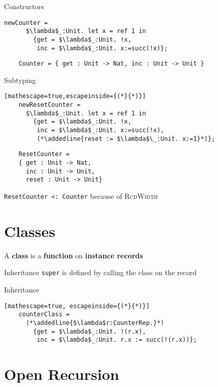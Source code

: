 \documentclass[presentation]{beamer}
\begin{document}
\begin{frame}[fragile]{Constructors}
  \centering
  \begin{lstlisting}[mathescape=true]
    newCounter =
      $\lambda$_:Unit. let x = ref 1 in
        {get = $\lambda$_:Unit. !x,
         inc = $\lambda$_:Unit. x:=succ(!x)};
  \end{lstlisting}

  \begin{lstlisting}
    Counter = { get : Unit -> Nat, inc : Unit -> Unit }
  \end{lstlisting}
\end{frame}

\newcommand{\addedline}[1]{\tikz{\node[fill=green]{#1}}}

\begin{frame}[fragile]{Subtyping}
  \centering
  \begin{block}{ }
  \begin{lstlisting}[mathescape=true,escapeinside={(*}{*)}]
    newResetCounter =
      $\lambda$_:Unit. let x = ref 1 in
        {get = $\lambda$_:Unit. !x,
         inc = $\lambda$_:Unit. x:=succ(!x),
         (*\addedline{reset := $\lambda$\_:Unit. x:=1}*)};
  \end{lstlisting}
  \end{block}

  \centering
  \begin{lstlisting}
    ResetCounter =
    { get : Unit -> Nat,
      inc : Unit -> Unit,
      reset : Unit -> Unit}
  \end{lstlisting}

  \centering
  \texttt{ResetCounter <: Counter} because of \textsc{RcdWidth}

\end{frame}

\section{Classes}

\begin{frame}
  \centering
  A \textbf{class} is a \textbf{function} on \textbf{instance records}

\end{frame}

\begin{frame}{Inheritance}
  \centering
  \texttt{super} is defined by calling the class on the record
\end{frame}

\begin{frame}[fragile]{Inheritance}
  \centering
  \begin{lstlisting}[mathescape=true, escapeinside={(*}{*)}]
    counterClass =
      (*\addedline{$\lambda$r:CounterRep.}*)
        {get = $\lambda$_:Unit. !(r.x),
         inc = $\lambda$_:Unit. r.x := succ(!(r.x))};
  \end{lstlisting}
\end{frame}

\section{Open Recursion}
\end{document}
